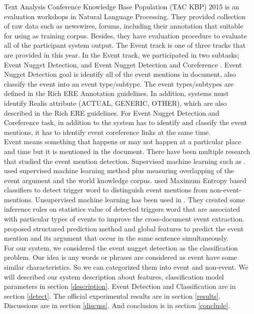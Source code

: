 \documentclass[11pt]{article}
\begin{document}
Text Analysis Conference Knowledge Base Population (TAC KBP) 2015 is an evaluation workshops in Natural Language Processing. They provided collection of raw data such as newswires, forums, including their annotation that suitable for using as training corpus. Besides, they have evaluation procedure to evaluate all of the participant system output. The Event track is one of three tracks that are provided in this year. In the Event track, we participated in two subtasks; Event Nugget Detection, and Event Nugget Detection and Coreference \cite{teruko2,teruko}. Event Nugget Detection goal is identify all of the event mentions in document, also classify the event into an event type/subtype. The event types/subtypes are defined in the Rich ERE Annotation guidelines. In addition, systems must identify Realis attribute (ACTUAL, GENERIC, OTHER), which are also described in the Rich ERE guidelines. For Event Nugget Detection and Coreference task, in addition to the system has to identify and classify the event mentions, it has to identify event coreference links at the same time. \\
\indent Event means something that happens or may not happen at a particular place and time but it is mentioned in the document. There have been multiple research that studied the event mention detection. Supervised machine learning such as \cite{uiccg,grishman}. \cite{uiccg} used supervised machine learning method plus measuring overlapping of the event argument and the world knowledge corpus. \cite{grishman} used Maximum Entropy based classifiers to detect trigger word to distinguish event mentions from non-event-mentions. Unsupervised machine learning has been used in \cite{heng}. They created some inference rules on statistics value of detected triggers word that are associated with particular types of events to improve the cross-document event extraction. \cite{li} proposed structured prediction method and global features to predict the event mention and its argument that occur in the same sentence simultaneously.\\
\indent For our system, we considered the event nugget detection as the classification problem. Our idea is any words or phrases are considered as event have some similar characteristics. So we can categorized them into event and non-event. We will described our system description about features, classification model parameters in section \ref{description}. Event Detection and Classification are in section \ref{detect}. The official experimental results are in section \ref{results}. Discussions are in section \ref{discuss}. And conclusion is in section \ref{conclude}.  
\end{document}
